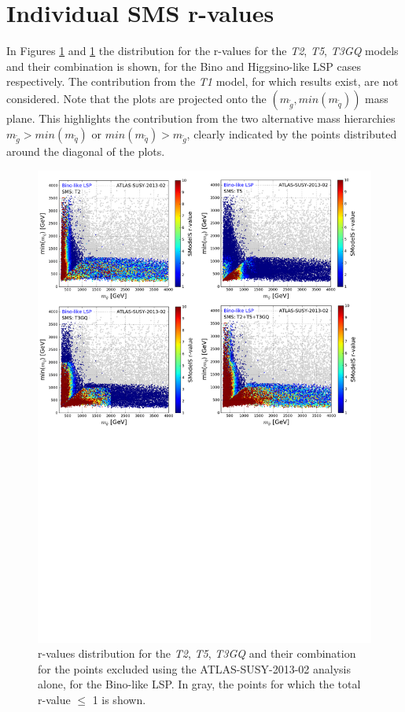 \documentclass[epj,nopacs,fleqn]{svjour}
\begin{document}
\section{Individual SMS r-values}
In Figures \ref{} and \ref{} the distribution for the r-values for the \textit{T2}, \textit{T5}, \textit{T3GQ} models and their combination is shown, for the Bino and Higgsino-like LSP cases respectively. The contribution from the \textit{T1} model, for which results exist, are not considered. Note that the plots are projected onto the $(m_{\tilde g}, min(m_{\tilde q}))$ mass plane. This highlights the contribution from the two alternative mass hierarchies $m_{\tilde g} > min(m_{\tilde q})$ or $min(m_{\tilde q}) > m_{\tilde g} $, clearly indicated by the points distributed around the diagonal of the plots. 
\\
\begin{figure}[!]
\begin{center}
\includegraphics[width=1\textwidth]{PLOTS/App/Bino_Combo.pdf}
\end{center}
\caption{r-values distribution for the \textit{T2}, \textit{T5}, \textit{T3GQ} and their combination for the points excluded using the ATLAS-SUSY-2013-02 analysis alone, for the Bino-like LSP. In gray, the points for which the total r-value $\leq$ 1 is shown.} 
\label{rvalues-bino}
\end{figure}
\\
\end{document}
